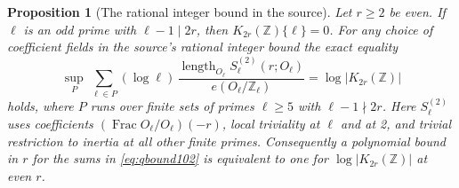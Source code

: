 \documentclass[a4paper,11pt]{article}
\newtheorem{proposition}{Proposition}[section]
\theoremstyle{definition}
\theoremstyle{remark}
\newcommand{\ZZ}{\mathbb Z}\newcommand{\ord}{\operatorname{ord}}
\numberwithin{equation}{section}
\begin{document}
\begin{proposition}[The rational integer bound in the source]
\leavevmode\label{prop:qbound102}
Let \(r\ge2\) be even. If \(\ell\) is an odd prime with
\(\ell-1\mid 2r\), then \(K_{2r}(\ZZ)\{\ell\}=0\).
For any choice of coefficient fields in the source's rational
integer bound the exact equality
\begin{equation}
 \sup_{P}\ \sum_{\ell\in P}(\log\ell)\,
     \frac{\operatorname{length}_{O_\ell} S_\ell^{(2)}(r;O_\ell)}
          {e(O_\ell/\ZZ_\ell)}
                         =\log|K_{2r}(\ZZ)|                       \label{eq:qbound102}
\end{equation}
holds, where \(P\) runs over finite sets of primes
\(\ell\ge5\) with \(\ell-1\nmid 2r\).
Here \(S_\ell^{(2)}\) uses coefficients
\((\operatorname{Frac}O_\ell/O_\ell)(-r)\), local triviality
at \(\ell\) and at 2, and trivial restriction to inertia at
all other finite primes. Consequently a polynomial bound in \(r\)
for the sums in \eqref{eq:qbound102} is equivalent to one for
\(\log |K_{2r}(\ZZ)|\) at even \(r\).
\end{proposition}
\end{document}
